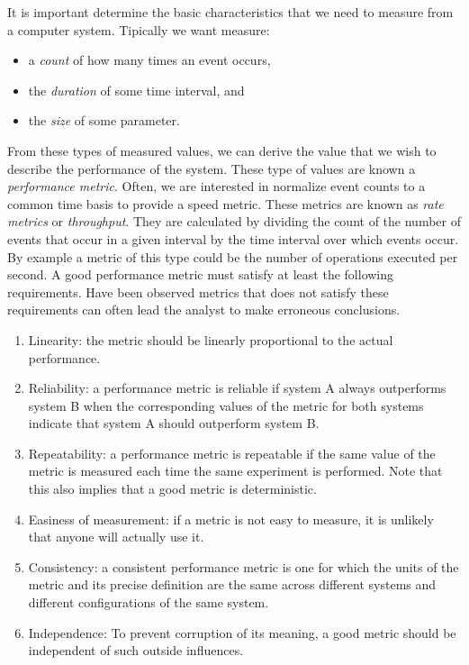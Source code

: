\documentclass[openany, a4paper]{book}
\theoremstyle{plain}
\theoremstyle{definition}
\theoremstyle{remark}
\begin{document}
It is important determine the basic characteristics that we need to measure
from a computer system. Tipically we want measure:

\begin{itemize}
\item a \emph{count} of how many times an event occurs,
\item the \emph{duration} of some time interval, and
\item the \emph{size} of some parameter.
\end{itemize}


From these types of measured values, we can derive the value that we wish to
describe the performance of the system. These type of values are known a
\emph{performance metric}. Often, we are interested in normalize event counts to a
common time basis to provide a speed metric. These metrics are known as \emph{rate
metrics} or \emph{throughput}. They are calculated by dividing the count of the
number of events that occur in a given interval by the time interval over
which events occur. By example a metric of this type could be the number of
operations executed per second. A good performance metric must satisfy at
least the following requirements. Have been observed metrics that does not
satisfy these requirements can often lead the analyst to make erroneous
conclusions.

\begin{enumerate}
\item Linearity: the metric should be linearly proportional to the actual
performance.
\item Reliability: a performance metric is reliable if system A always
outperforms system B when the corresponding values of the metric for both
systems indicate that system A should outperform system B.
\item Repeatability: a performance metric is repeatable if the same value of the
metric is measured each time the same experiment is performed. Note that
this also implies that a good metric is deterministic.
\item Easiness of measurement: if a metric is not easy to measure, it is
unlikely that anyone will actually use it.
\item Consistency: a consistent performance metric is one for which the units of
the metric and its precise definition are the same across different
systems and different configurations of the same system.
\item Independence: To prevent corruption of its meaning, a good metric should
be independent of such outside influences.
\end{enumerate}
\end{document}
